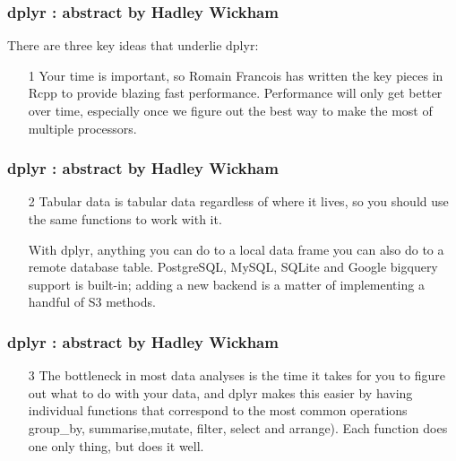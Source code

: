 \documentclass{beamer}
\begin{document}
\begin{frame}
\frametitle{dplyr : abstract by Hadley Wickham}	
	
	\noindent There are three key ideas that underlie dplyr:
	
	\begin{enumerate}
		\item[1] Your time is important, so Romain Francois has written the key pieces in Rcpp to provide blazing fast performance. Performance will only get better over time, especially once we figure out the best way to make the most of multiple processors. 
\end{enumerate}
\end{frame}
\begin{frame}
\frametitle{dplyr : abstract by Hadley Wickham}	

\begin{enumerate}
		\item[2] Tabular data is tabular data regardless of where it lives, so you should use the same functions to work with it. 
		
		With dplyr, anything you can do to a local data frame you can also do to a remote database table. PostgreSQL, MySQL, SQLite and Google bigquery support is built-in; adding a new backend is a matter of implementing a handful of S3 methods. 
\end{enumerate}
\end{frame}
\begin{frame}
\frametitle{dplyr : abstract by Hadley Wickham}	

	\begin{enumerate}
		\item[3] The bottleneck in most data analyses is the time it takes for you to figure out what to do with your data, and dplyr makes this easier by having individual functions that correspond to the most common operations  group\_by, summarise,mutate, filter, select and arrange). Each function does one only thing, but does it well.
	\end{enumerate}
\end{frame}
\end{document}
